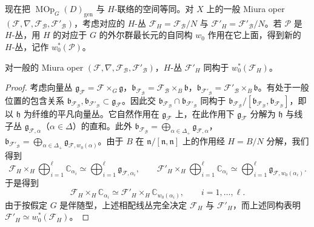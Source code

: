 现在把 $\operatorname{MOp}_G(D)_{\mathrm{gen}}$ 与 $H$-联络的空间等同。对 $X$ 上的一般 Miura oper $(\mathcal F,\nabla,\mathcal F_{\mathcal B},\mathcal F'_{\mathcal B})$，考虑对应的 $H$-丛 $\mathcal F_H=\mathcal F_{\mathcal B}/N$ 与 $\mathcal F'_H=\mathcal F'_{\mathcal B}/N$。若 $\mathcal P$ 是 $H$-丛，用 $H$ 的对应于 $G$ 的外尔群最长元的自同构 $w_0$ 作用在它上面，得到新的 $H$-丛，记作 $w_0^*(\mathcal P)$。


\begin{lemma}
    对一般的 Miura oper $(\mathcal F,\nabla,\mathcal F_{\mathcal B},\mathcal F'_{\mathcal B})$，$H$-丛 $\mathcal F'_H$ 同构于 $w_0^*(\mathcal F_H)$。
\end{lemma}

\begin{proof}
考虑向量丛 $\mathfrak g_{\mathcal F}=\mathcal F\times_G\mathfrak g$，$\mathfrak b_{\mathcal F_{\mathcal B}}=\mathcal F_{\mathcal B}\times_B\mathfrak b$，$\mathfrak b_{\mathcal F'_{\mathcal B}}=\mathcal F'_{\mathcal B}\times_B\mathfrak b$。有处于一般位置的包含关系 $\mathfrak b_{\mathcal F_{\mathcal B}},\mathfrak b_{\mathcal F'_{\mathcal B}}\subset\mathfrak g_{\mathcal F}$。因此交 $\mathfrak b_{\mathcal F_{\mathcal B}}\cap\mathfrak b_{\mathcal F'_{\mathcal B}}$ 同构于 $\mathfrak b_{\mathcal F_{\mathcal B}}/[\mathfrak b_{\mathcal F_{\mathcal B}},\mathfrak b_{\mathcal F_{\mathcal B}}]$，即以 $\mathfrak h$ 为纤维的平凡向量丛。它自然作用在 $\mathfrak g_{\mathcal F}$ 上，在此作用下 $\mathfrak g_{\mathcal F}$ 分解为 $\mathfrak h$ 与线子丛 $\mathfrak g_{\mathcal F,\alpha}$（$\alpha\in\Delta$）的直和。此外 $\mathfrak b_{\mathcal F_{\mathcal B}}=\bigoplus_{\alpha\in\Delta_+}\mathfrak g_{\mathcal F,\alpha}$，$\mathfrak b_{\mathcal F'_{\mathcal B}}=\bigoplus_{\alpha\in\Delta_+}\mathfrak g_{\mathcal F,w_0(\alpha)}$。由于 $B$ 在 $\mathfrak n/[\mathfrak n,\mathfrak n]$ 上的作用经 $H=B/N$ 分解，我们得到
\[
    \mathcal F_H\times_H\bigoplus_{i=1}^{\ell}\mathbb C_{\alpha_i}\simeq\bigoplus_{i=1}^{\ell}\mathfrak g_{\mathcal F,\alpha_i},
    \qquad
    \mathcal F'_H\times_H\bigoplus_{i=1}^{\ell}\mathbb C_{\alpha_i}\simeq\bigoplus_{i=1}^{\ell}\mathfrak g_{\mathcal F,w_0(\alpha_i)}.
\]
于是得到
\[
    \mathcal F_H\times_H\mathbb C_{\alpha_i}\simeq\mathcal F'_H\times_H\mathbb C_{w_0(\alpha_i)},
    \qquad i=1,\dots,\ell.
\]
由于按假定 $G$ 是伴随型，上述相配线丛完全决定 $\mathcal F_H$ 与 $\mathcal F'_H$，而上述同构表明 $\mathcal F'_H\simeq w_0^*(\mathcal F_H)$。
\end{proof}

